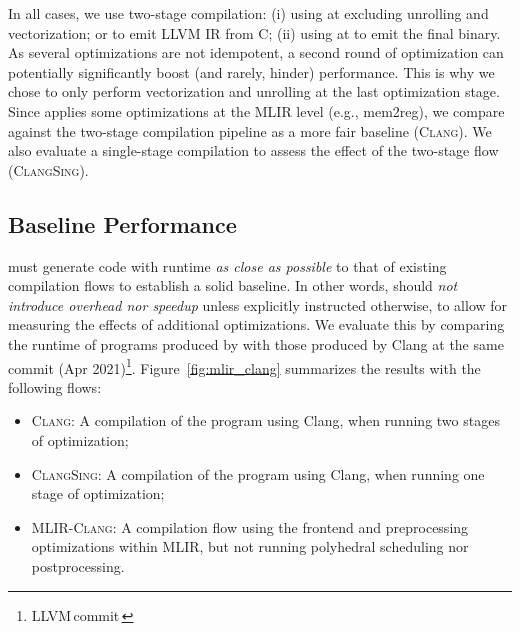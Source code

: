 
In all cases, we use two-stage compilation: (i) using  at  excluding unrolling and vectorization; or \tool to emit LLVM IR from C; (ii) using  at  to emit the final binary. As several optimizations are not idempotent, a second round of optimization can potentially significantly boost (and rarely, hinder) performance. This is why we chose to only perform vectorization and unrolling at the last optimization stage. Since \tool applies some optimizations at the MLIR level (e.g., mem2reg), we compare against the two-stage compilation pipeline as a more fair baseline (\textsc{Clang}). We also evaluate a single-stage compilation to assess the effect of the two-stage flow (\textsc{ClangSing}).

\subsection{Baseline Performance}
\label{sub:frontend}
\tool must generate code with runtime \emph{as close as possible} to that of existing compilation flows to establish a solid baseline. In other words, \tool should \emph{not introduce overhead nor speedup} unless explicitly instructed otherwise, to allow for measuring the effects of additional optimizations. We evaluate this by comparing the runtime of programs produced by \tool with those produced by Clang at the same commit (Apr 2021)\footnote{LLVM\,commit\,}. Figure~\ref{fig:mlir_clang} summarizes the results with the following flows:
\begin{itemize}
  \item \textsc{Clang}: A compilation of the program using Clang, when running two stages of optimization;
  \item \textsc{ClangSing}: A compilation of the program using Clang, when running one stage of optimization;
  \item \textsc{MLIR-Clang}: A compilation flow using the \tool frontend and preprocessing optimizations within MLIR, but not running polyhedral scheduling nor postprocessing.
\end{itemize}

